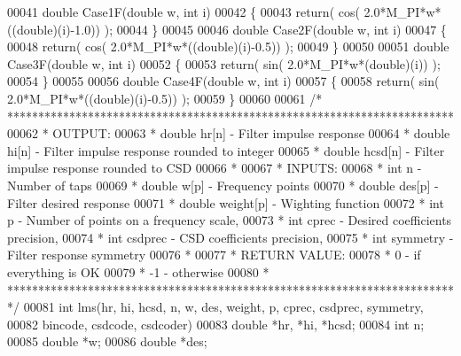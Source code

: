 \begin{DoxyCode}
00041 \textcolor{keywordtype}{double} Case1F(\textcolor{keywordtype}{double} w, \textcolor{keywordtype}{int} i)
00042 \{
00043     \textcolor{keywordflow}{return}( cos( 2.0*M\_PI*w*((\textcolor{keywordtype}{double})(i)-1.0)) );
00044 \}
00045 
00046 \textcolor{keywordtype}{double} Case2F(\textcolor{keywordtype}{double} w, \textcolor{keywordtype}{int} i)
00047 \{
00048     \textcolor{keywordflow}{return}( cos( 2.0*M\_PI*w*((\textcolor{keywordtype}{double})(i)-0.5)) );
00049 \}
00050 
00051 \textcolor{keywordtype}{double} Case3F(\textcolor{keywordtype}{double} w, \textcolor{keywordtype}{int} i)
00052 \{
00053     \textcolor{keywordflow}{return}( sin( 2.0*M\_PI*w*(\textcolor{keywordtype}{double})(i)) );
00054 \}
00055 
00056 \textcolor{keywordtype}{double} Case4F(\textcolor{keywordtype}{double} w, \textcolor{keywordtype}{int} i)
00057 \{
00058     \textcolor{keywordflow}{return}( sin( 2.0*M\_PI*w*((\textcolor{keywordtype}{double})(i)-0.5)) );
00059 \}
00060 
00061 \textcolor{comment}{/* ************************************************************************ }
00062 \textcolor{comment}{ *  OUTPUT:}
00063 \textcolor{comment}{ *  double  hr[n]       - Filter impulse response}
00064 \textcolor{comment}{ *  double  hi[n]       - Filter impulse response rounded to integer}
00065 \textcolor{comment}{ *  double  hcsd[n]     - Filter impulse response rounded to CSD}
00066 \textcolor{comment}{ *}
00067 \textcolor{comment}{ *  INPUTS:}
00068 \textcolor{comment}{ *  int     n       - Number of taps}
00069 \textcolor{comment}{ *  double  w[p]        - Frequency points}
00070 \textcolor{comment}{ *  double  des[p]      - Filter desired response}
00071 \textcolor{comment}{ *  double  weight[p]   - Wighting function}
00072 \textcolor{comment}{ *  int p       - Number of points on a frequency scale,}
00073 \textcolor{comment}{ *  int cprec       - Desired coefficients precision,}
00074 \textcolor{comment}{ *  int csdprec     - CSD coefficients precision,}
00075 \textcolor{comment}{ *  int symmetry    - Filter response symmetry}
00076 \textcolor{comment}{ *}
00077 \textcolor{comment}{ *  RETURN VALUE:}
00078 \textcolor{comment}{ *  0           - if everything is OK}
00079 \textcolor{comment}{ *  -1          - otherwise}
00080 \textcolor{comment}{ * ************************************************************************ */}
00081 \textcolor{keywordtype}{int} lms(hr, hi, hcsd, n, w, des, weight, p, cprec, csdprec, symmetry,
00082     bincode, csdcode, csdcoder)
00083 double *hr, *hi, *hcsd;
00084 \textcolor{keywordtype}{int} n;
00085 \textcolor{keywordtype}{double} *w;
00086 \textcolor{keywordtype}{double} *des;

\end{DoxyCode}
